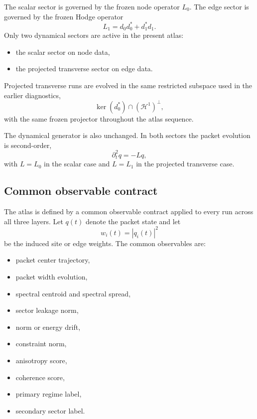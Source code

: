 \documentclass[11pt]{article}
\begin{document}
The scalar sector is governed by the frozen node operator $L_0$. The edge sector is governed by the frozen Hodge operator
\begin{equation}
L_1 = d_0 d_0^{*} + d_1^{*} d_1.
\end{equation}
Only two dynamical sectors are active in the present atlas:
\begin{itemize}
\item the scalar sector on node data,
\item the projected transverse sector on edge data.
\end{itemize}
Projected transverse runs are evolved in the same restricted subspace used in the earlier diagnostics,
\begin{equation}
\ker(d_0^{*}) \cap (\mathcal{H}^1)^\perp,
\end{equation}
with the same frozen projector throughout the atlas sequence.

The dynamical generator is also unchanged. In both sectors the packet evolution is second-order,
\begin{equation}
\partial_t^2 q = -L q,
\end{equation}
with $L=L_0$ in the scalar case and $L=L_1$ in the projected transverse case.

\subsection{Common observable contract}
The atlas is defined by a common observable contract applied to every run across all three layers. Let $q(t)$ denote the packet state and let
\begin{equation}
w_i(t) = |q_i(t)|^2
\end{equation}
be the induced site or edge weights. The common observables are:
\begin{itemize}
\item packet center trajectory,
\item packet width evolution,
\item spectral centroid and spectral spread,
\item sector leakage norm,
\item norm or energy drift,
\item constraint norm,
\item anisotropy score,
\item coherence score,
\item primary regime label,
\item secondary sector label.
\end{itemize}
\end{document}
